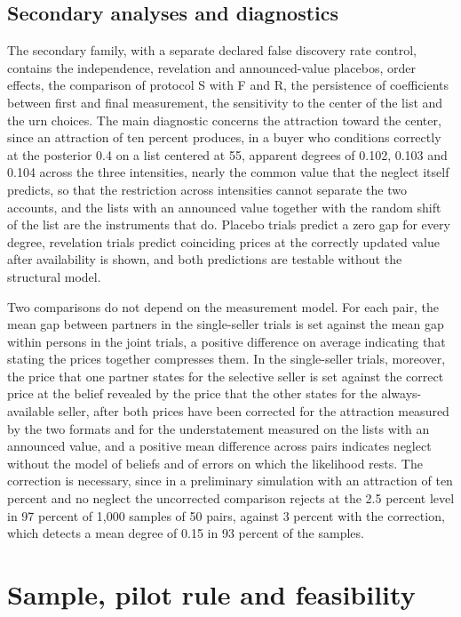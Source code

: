 \documentclass[11pt,a4paper]{article}
\begin{document}
\subsection{Secondary analyses and diagnostics}

The secondary family, with a separate declared false discovery rate control, contains the independence, revelation and announced-value placebos, order effects, the comparison of protocol S with F and R, the persistence of coefficients between first and final measurement, the sensitivity to the center of the list and the urn choices. The main diagnostic concerns the attraction toward the center, since an attraction of ten percent produces, in a buyer who conditions correctly at the posterior 0.4 on a list centered at 55, apparent degrees of 0.102, 0.103 and 0.104 across the three intensities, nearly the common value that the neglect itself predicts, so that the restriction across intensities cannot separate the two accounts, and the lists with an announced value together with the random shift of the list are the instruments that do. Placebo trials predict a zero gap for every degree, revelation trials predict coinciding prices at the correctly updated value after availability is shown, and both predictions are testable without the structural model.

Two comparisons do not depend on the measurement model. For each pair, the mean gap between partners in the single-seller trials is set against the mean gap within persons in the joint trials, a positive difference on average indicating that stating the prices together compresses them. In the single-seller trials, moreover, the price that one partner states for the selective seller is set against the correct price at the belief revealed by the price that the other states for the always-available seller, after both prices have been corrected for the attraction measured by the two formats and for the understatement measured on the lists with an announced value, and a positive mean difference across pairs indicates neglect without the model of beliefs and of errors on which the likelihood rests. The correction is necessary, since in a preliminary simulation with an attraction of ten percent and no neglect the uncorrected comparison rejects at the 2.5 percent level in 97 percent of 1,000 samples of 50 pairs, against 3 percent with the correction, which detects a mean degree of 0.15 in 93 percent of the samples.

\section{Sample, pilot rule and feasibility}
\end{document}
